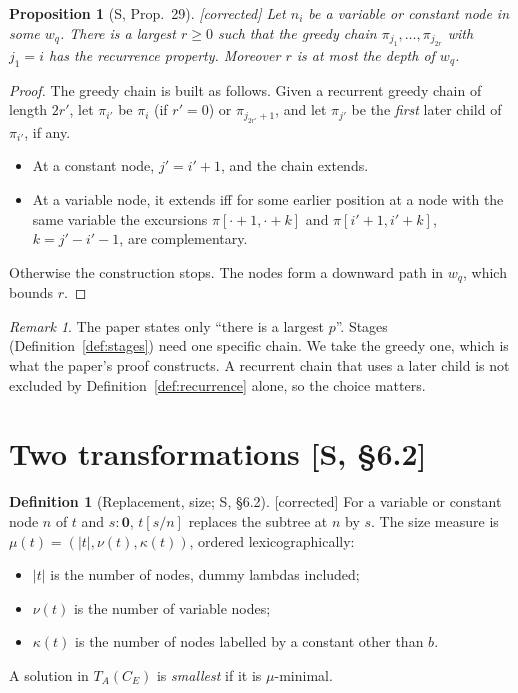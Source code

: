 \documentclass[11pt]{article}
\newcommand{\Ground}{\mathbf{0}}
\newcommand{\iv}[2]{\pi[#1,#2]}
\newcommand{\CE}{C_E}
\newcommand{\Fixed}{\textsf{[corrected]}}
\theoremstyle{plain}
\newtheorem{proposition}[theorem]{Proposition}
\theoremstyle{definition}
\newtheorem{definition}[theorem]{Definition}
\theoremstyle{remark}
\newtheorem{remark}[theorem]{Remark}
\begin{document}
\begin{proposition}[S, Prop.~29]\label{prop:29}
\Fixed{} Let $n_i$ be a variable or constant node in some $w_q$.  There
is a largest $r\ge0$ such that the \emph{greedy} chain
$\pi_{j_1},\dots,\pi_{j_{2r}}$ with $j_1=i$ has the recurrence property.
Moreover $r$ is at most the depth of $w_q$.
\end{proposition}
\begin{proof}
The greedy chain is built as follows.  Given a recurrent greedy chain of
length $2r'$, let $\pi_{i'}$ be $\pi_i$ (if $r'=0$) or
$\pi_{j_{2r'}+1}$, and let $\pi_{j'}$ be the \emph{first} later child of
$\pi_{i'}$, if any.
\begin{itemize}
\item At a constant node, $j'=i'+1$, and the chain extends.
\item At a variable node, it extends iff for some earlier position at a
  node with the same variable the excursions $\iv{\cdot+1}{\cdot+k}$ and
  $\iv{i'+1}{i'+k}$, $k=j'-i'-1$, are complementary.
\end{itemize}
Otherwise the construction stops.  The nodes form a downward path in
$w_q$, which bounds $r$.
\end{proof}

\begin{remark}
The paper states only ``there is a largest $p$''.  Stages
(Definition~\ref{def:stages}) need one specific chain.  We take the
greedy one, which is what the paper's proof constructs.  A recurrent
chain that uses a later child is not excluded by Definition~\ref{def:recurrence}
alone, so the choice matters.
\end{remark}

\section{Two transformations [S, \S6.2]}\label{sec:transformations}

\begin{definition}[Replacement, size; S, \S6.2]
\Fixed{} For a variable or constant node $n$ of $t$ and $s:\Ground$,
$t[s/n]$ replaces the subtree at $n$ by $s$.  The size measure is
$\mu(t)=(|t|,\nu(t),\kappa(t))$, ordered lexicographically:
\begin{itemize}
\item $|t|$ is the number of nodes, dummy lambdas included;
\item $\nu(t)$ is the number of variable nodes;
\item $\kappa(t)$ is the number of nodes labelled by a constant other
  than $b$.
\end{itemize}
A solution in $T_A(\CE)$ is \emph{smallest} if it is $\mu$-minimal.
\end{definition}
\end{document}
